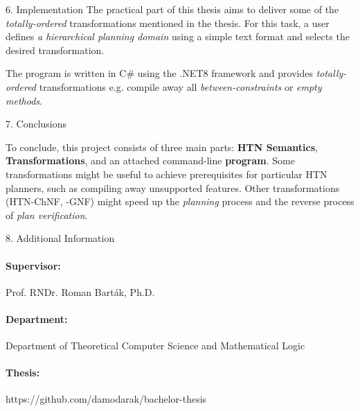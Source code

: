 \documentclass[portrait,a0paper,fontscale=0.25]{baposter}
\begin{document}
\begin{poster}
\begin{posterbox}[column=1, name=implementation, below=trans]{6. Implementation}
The practical part of this thesis aims to deliver some of the \emph{totally-ordered} transformations mentioned in the thesis. For this task, a user defines \emph{a hierarchical planning domain} using a simple text format and selects the desired transformation.

\vspace{5mm}

The program is written in C\# using the .NET8 framework and provides \emph{totally-ordered} transformations e.g. compile away all \emph{between-constraints} or \emph{empty methods}.


\end{posterbox}

\begin{posterbox}[column=1, name=conclusion, below=implementation, headerColorOne=green!59!yellow, boxColorOne=green!10]{7. Conclusions}

To conclude, this project consists of three main parts: \textbf{HTN Semantics}, \textbf{Transformations}, and an attached command-line \textbf{program}. Some transformations might be useful to achieve prerequisites for particular HTN planners, such as compiling away unsupported features. Other transformations (HTN-ChNF, -GNF) might speed up the \emph{planning} process and the reverse process of \emph{plan verification}.

\end{posterbox}

\begin{posterbox}[column=1, name=info, below=conclusion]{8. Additional Information}

\paragraph{Supervisor:} Prof. RNDr. Roman Barták, Ph.D.
\paragraph{Department:} Department of Theoretical Computer Science and Mathematical Logic
\paragraph{Thesis:} https://github.com/damodarak/bachelor-thesis

\end{posterbox}

\end{poster}
\end{document}
